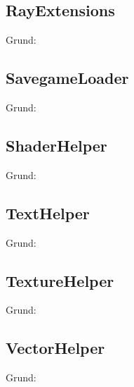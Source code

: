 \subsection{RayExtensions}
Grund:
\subsection{SavegameLoader}
Grund:
\subsection{ShaderHelper}
Grund:
\subsection{TextHelper}
Grund:
\subsection{TextureHelper}
Grund:
\subsection{VectorHelper}
Grund:



